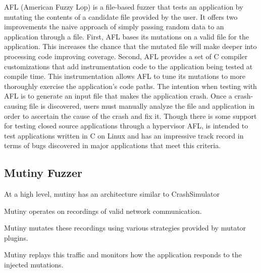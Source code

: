 AFL (American Fuzzy Lop) is a file-based fuzzer that tests an application
by mutating the contents of a candidate file provided by the user.  It
offers two improvements the naive approach of simply passing random data to
an application through a file.  First, AFL bases its mutations on a valid
file for the application.  This increases the chance that the mutated file
will make deeper into processing code improving coverage.  Second, AFL
provides a set of C compiler customizations that add instrumentation code
to the application being tested at compile time.  This instrumentation
allows AFL to tune its mutations to more thoroughly exercise the
application's code paths.  The intention when testing with AFL is to
generate an input file that makes the application crash.  Once a
crash-causing file is discovered, users must manually analyze the file and
application in order to ascertain the cause of the crash and fix it.
Though there is some support for testing closed source applications through
a hypervisor AFL, is intended to test applications written in C on Linux
and has an impressive track record in terms of bugs discovered in major
applications that meet this criteria.


\subsection{Mutiny Fuzzer}

At a high level, mutiny has an architecture similar to CrashSimulator

Mutiny operates on recordings of valid network communication.

Mutiny mutates these recordings using various strategies provided by
mutator plugins.

Mutiny replays this traffic and monitors how the application responds to
the injected mutations.
